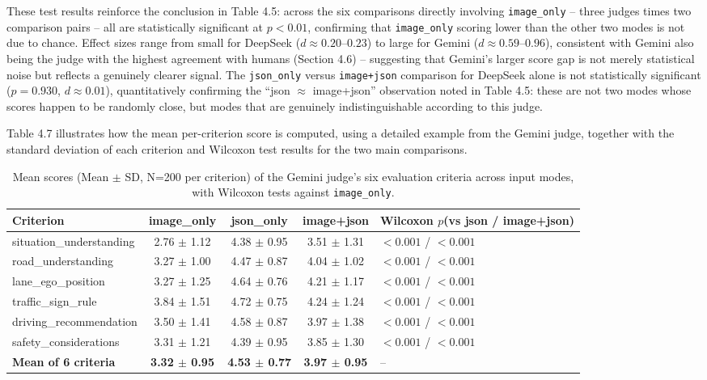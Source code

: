 \documentclass[12pt,a4paper]{report}
\begin{document}
These test results reinforce the conclusion in Table 4.5: across the six comparisons directly involving \texttt{image\_only} -- three judges times two comparison pairs -- all are statistically significant at $p<0.01$, confirming that \texttt{image\_only} scoring lower than the other two modes is not due to chance. Effect sizes range from small for DeepSeek ($d \approx 0.20$--$0.23$) to large for Gemini ($d \approx 0.59$--$0.96$), consistent with Gemini also being the judge with the highest agreement with humans (Section 4.6) -- suggesting that Gemini's larger score gap is not merely statistical noise but reflects a genuinely clearer signal. The \texttt{json\_only} versus \texttt{image+json} comparison for DeepSeek alone is not statistically significant ($p=0.930$, $d \approx 0.01$), quantitatively confirming the ``json $\approx$ image+json'' observation noted in Table 4.5: these are not two modes whose scores happen to be randomly close, but modes that are genuinely indistinguishable according to this judge.

Table 4.7 illustrates how the mean per-criterion score is computed, using a detailed example from the Gemini judge, together with the standard deviation of each criterion and Wilcoxon test results for the two main comparisons.

\begin{table}[htbp]
    \centering
    \footnotesize
    \caption{Mean scores (Mean $\pm$ SD, N=200 per criterion) of the Gemini judge's six evaluation criteria across input modes, with Wilcoxon tests against \texttt{image\_only}.}
    \label{tab:4.7}
    \begin{tabular}{@{}p{3.2cm}ccc p{2.4cm}@{}}
        \toprule
        \textbf{Criterion} & \textbf{image\_only} & \textbf{json\_only} & \textbf{image+json} & \textbf{Wilcoxon $p$}\newline(vs json / image+json) \\
        \midrule
        situation\_understanding  & 2.76 $\pm$ 1.12 & 4.38 $\pm$ 0.95 & 3.51 $\pm$ 1.31 & $<0.001$ / $<0.001$ \\
        road\_understanding       & 3.27 $\pm$ 1.00 & 4.47 $\pm$ 0.87 & 4.04 $\pm$ 1.02 & $<0.001$ / $<0.001$ \\
        lane\_ego\_position       & 3.27 $\pm$ 1.25 & 4.64 $\pm$ 0.76 & 4.21 $\pm$ 1.17 & $<0.001$ / $<0.001$ \\
        traffic\_sign\_rule       & 3.84 $\pm$ 1.51 & 4.72 $\pm$ 0.75 & 4.24 $\pm$ 1.24 & $<0.001$ / $<0.001$ \\
        driving\_recommendation   & 3.50 $\pm$ 1.41 & 4.58 $\pm$ 0.87 & 3.97 $\pm$ 1.38 & $<0.001$ / $<0.001$ \\
        safety\_considerations    & 3.31 $\pm$ 1.21 & 4.39 $\pm$ 0.95 & 3.85 $\pm$ 1.30 & $<0.001$ / $<0.001$ \\
        \textbf{Mean of 6 criteria} & \textbf{3.32 $\pm$ 0.95} & \textbf{4.53 $\pm$ 0.77} & \textbf{3.97 $\pm$ 0.95} & -- \\
        \bottomrule
    \end{tabular}
\end{table}
\end{document}
